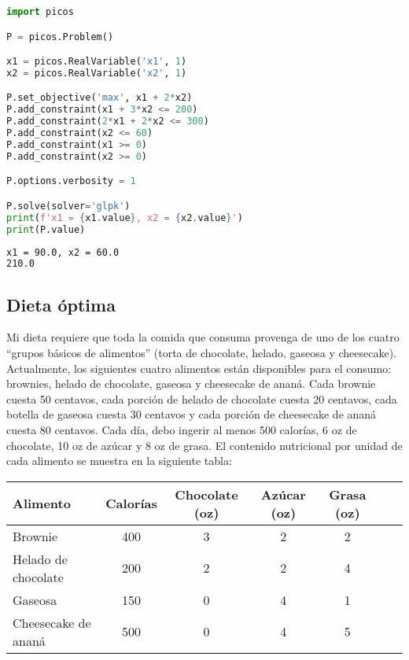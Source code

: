\documentclass[12pt]{article}
\begin{document}
\begin{lstlisting}[language=Python]
import picos

P = picos.Problem()

x1 = picos.RealVariable('x1', 1)
x2 = picos.RealVariable('x2', 1)

P.set_objective('max', x1 + 2*x2)
P.add_constraint(x1 + 3*x2 <= 200)
P.add_constraint(2*x1 + 2*x2 <= 300)
P.add_constraint(x2 <= 60)
P.add_constraint(x1 >= 0)
P.add_constraint(x2 >= 0)

P.options.verbosity = 1

P.solve(solver='glpk')
print(f'x1 = {x1.value}, x2 = {x2.value}')
print(P.value)
\end{lstlisting}

\begin{lstlisting}[language=bash,backgroundcolor=\color{black},basicstyle=\color{white}\ttfamily,numbers=none]
x1 = 90.0, x2 = 60.0
210.0
\end{lstlisting}


\subsection{Dieta óptima}

Mi dieta requiere que toda la comida que consuma provenga de uno de los cuatro ``grupos básicos de alimentos'' (torta de chocolate, helado, gaseosa y cheesecake). Actualmente, los siguientes cuatro alimentos están disponibles para el consumo: brownies, helado de chocolate, gaseosa y cheesecake de ananá. Cada brownie cuesta 50 centavos, cada porción de helado de chocolate cuesta 20 centavos, cada botella de gaseosa cuesta 30 centavos y cada porción de cheesecake de ananá cuesta 80 centavos. Cada día, debo ingerir al menos 500 calorías, 6 oz de chocolate, 10 oz de azúcar y 8 oz de grasa. El contenido nutricional por unidad de cada alimento se muestra en la siguiente tabla:

\begin{table}[H]
    \centering
    \begin{tabular}{lcccccc}
        \toprule
        \textbf{Alimento} & \textbf{Calorías} & \textbf{Chocolate (oz)} & \textbf{Azúcar (oz)} & \textbf{Grasa (oz)} \\
        \midrule
        Brownie                & 400 & 3 & 2 & 2 \\
        Helado de chocolate    & 200 & 2 & 2 & 4 \\
        Gaseosa                & 150 & 0 & 4 & 1 \\
        Cheesecake de ananá    & 500 & 0 & 4 & 5 \\
        \bottomrule
    \end{tabular}
\end{table}
\end{document}
